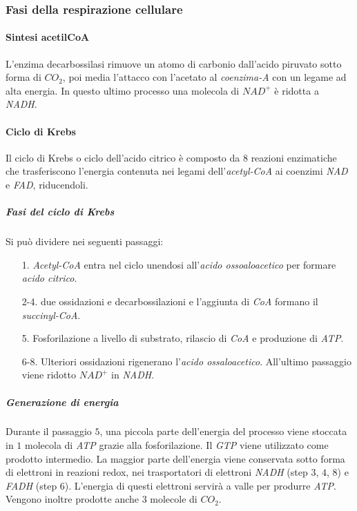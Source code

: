			\subsubsection{Fasi della respirazione cellulare}	

				\paragraph{Sintesi acetilCoA}
				L'enzima decarbossilasi rimuove un atomo di carbonio dall'acido piruvato sotto forma di $CO_2$, poi media l'attacco con l'acetato al \emph{coenzima-A} con un legame ad alta energia. 
				In questo ultimo processo una molecola di \emph{$NAD^{+}$} \`e ridotta a \emph{NADH}.

				\paragraph{Ciclo di Krebs}
				Il ciclo di Krebs o ciclo dell'acido citrico \`e composto da $8$ reazioni enzimatiche che trasferiscono l'energia contenuta nei legami dell'\emph{acetyl-CoA} ai coenzimi \emph{NAD} e \emph{FAD}, riducendoli.

					\subparagraph{Fasi del ciclo di Krebs}
					Si pu\`o dividere nei seguenti passaggi:
					\begin{multicols}{2}
						\begin{itemize}
							\item[1.] \emph{Acetyl-CoA} entra nel ciclo unendosi all'\emph{acido ossoaloacetico} per formare \emph{acido citrico}.
							\item[2-4.] due ossidazioni e decarbossilazioni e l'aggiunta di \emph{CoA} formano il \emph{succinyl-CoA}.
							\item[5.] Fosforilazione a livello di substrato, rilascio di \emph{CoA} e produzione di \emph{ATP}.
							\item[6-8.] Ulteriori ossidazioni rigenerano l'\emph{acido ossaloacetico}.
								All'ultimo passaggio viene ridotto \emph{$NAD^+$} in \emph{NADH}.
						\end{itemize}
					\end{multicols}
					
					\subparagraph{Generazione di energia}
					Durante il passaggio $5$, una piccola parte dell'energia del processo viene stoccata in $1$ molecola di \emph{ATP} grazie alla fosforilazione.
					Il \emph{GTP} viene utilizzato come prodotto intermedio.
					La maggior parte dell'energia viene conservata sotto forma di elettroni in reazioni redox, nei trasportatori di elettroni \emph{NADH} (step $3$, $4$, $8$) e \emph{FADH} (step $6$). 
					L'energia di questi elettroni servir\`a a valle per produrre \emph{ATP}.
					Vengono inoltre prodotte anche $3$ molecole di $CO_2$. 
		
